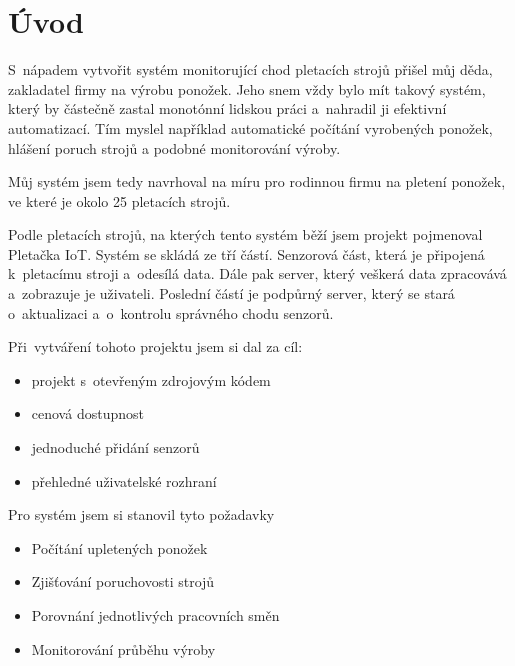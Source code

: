 \chapter*{Úvod}

S~nápadem vytvořit systém monitorující chod pletacích strojů přišel můj děda, zakladatel firmy na výrobu ponožek.
Jeho snem vždy bylo mít takový systém, který by částečně zastal monotónní lidskou práci a~nahradil ji efektivní automatizací.
Tím myslel například automatické počítání vyrobených ponožek, hlášení poruch strojů a podobné monitorování výroby.

Můj systém jsem tedy navrhoval na míru pro rodinnou firmu na pletení ponožek, ve které je okolo 25 pletacích strojů. 

Podle pletacích strojů, na kterých tento systém běží jsem projekt pojmenoval Pletačka IoT. 
Systém se skládá ze tří částí. Senzorová část, která je připojená k~pletacímu stroji a~odesílá data.
Dále pak server, který veškerá data zpracovává a~zobrazuje je uživateli.
Poslední částí je podpůrný server, který se stará o~aktualizaci a~o~kontrolu správného chodu senzorů.\newline


Při~vytváření tohoto projektu jsem si dal za cíl:
\begin{itemize}
    \item projekt s~otevřeným zdrojovým kódem
    \item cenová dostupnost
    \item jednoduché přidání senzorů
    \item přehledné uživatelské rozhraní
\end{itemize}

\newpage
Pro systém jsem si stanovil tyto požadavky
\begin{itemize}
    \item Počítání upletených ponožek
    \item Zjišťování poruchovosti strojů
    \item Porovnání jednotlivých pracovních směn
    \item Monitorování průběhu výroby
\end{itemize}

